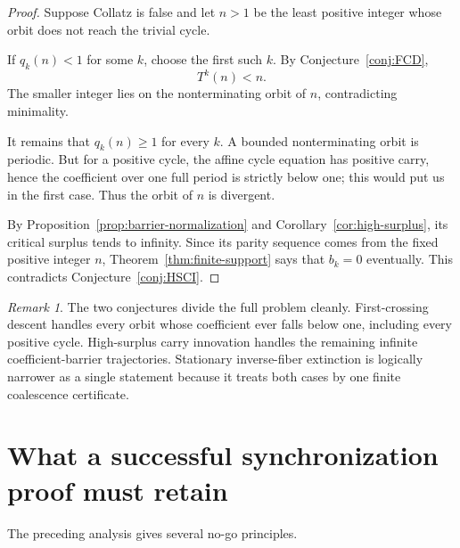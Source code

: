 \documentclass[11pt,reqno]{amsart}
\numberwithin{equation}{section}
\theoremstyle{definition}
\theoremstyle{remark}
\newtheorem{remark}[theorem]{Remark}
\begin{document}
\begin{proof}
Suppose Collatz is false and let $n>1$ be the least positive integer whose
orbit does not reach the trivial cycle.

If $q_k(n)<1$ for some $k$, choose the first such $k$.  By
Conjecture~\ref{conj:FCD},
\[
T^k(n)<n.
\]
The smaller integer lies on the nonterminating orbit of $n$, contradicting
minimality.

It remains that $q_k(n)\ge1$ for every $k$.  A bounded nonterminating orbit is
periodic.  But for a positive cycle, the affine cycle equation has positive
carry, hence the coefficient over one full period is strictly below one;
this would put us in the first case.  Thus the orbit of $n$ is divergent.

By Proposition~\ref{prop:barrier-normalization} and
Corollary~\ref{cor:high-surplus}, its critical surplus tends to infinity.
Since its parity sequence comes from the fixed positive integer $n$,
Theorem~\ref{thm:finite-support} says that $b_k=0$ eventually.  This
contradicts Conjecture~\ref{conj:HSCI}.
\end{proof}

\begin{remark}
The two conjectures divide the full problem cleanly.  First-crossing descent
handles every orbit whose coefficient ever falls below one, including every
positive cycle.  High-surplus carry innovation handles the remaining
infinite coefficient-barrier trajectories.  Stationary inverse-fiber
extinction is logically narrower as a single statement because it treats
both cases by one finite coalescence certificate.
\end{remark}

\section{What a successful synchronization proof must retain}

The preceding analysis gives several no-go principles.
\end{document}
